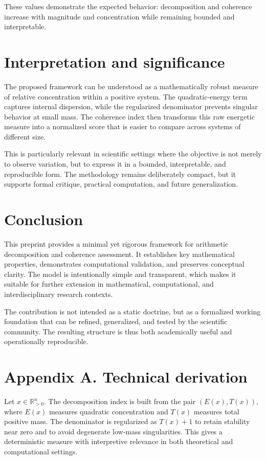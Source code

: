 \documentclass[11pt]{article}
\begin{document}
These values demonstrate the expected behavior: decomposition and coherence increase with magnitude and concentration while remaining bounded and interpretable.

\section{Interpretation and significance}
The proposed framework can be understood as a mathematically robust measure of relative concentration within a positive system. The quadratic-energy term captures internal dispersion, while the regularized denominator prevents singular behavior at small mass. The coherence index then transforms this raw energetic measure into a normalized score that is easier to compare across systems of different size.

This is particularly relevant in scientific settings where the objective is not merely to observe variation, but to express it in a bounded, interpretable, and reproducible form. The methodology remains deliberately compact, but it supports formal critique, practical computation, and future generalization.

\section{Conclusion}
This preprint provides a minimal yet rigorous framework for arithmetic decomposition and coherence assessment. It establishes key mathematical properties, demonstrates computational validation, and preserves conceptual clarity. The model is intentionally simple and transparent, which makes it suitable for further extension in mathematical, computational, and interdisciplinary research contexts.

The contribution is not intended as a static doctrine, but as a formalized working foundation that can be refined, generalized, and tested by the scientific community. The resulting structure is thus both academically useful and operationally reproducible.

\appendix
\section{Appendix A. Technical derivation}
Let $x\in\mathbb{R}_{>0}^n$. The decomposition index is built from the pair $(E(x), T(x))$, where $E(x)$ measures quadratic concentration and $T(x)$ measures total positive mass. The denominator is regularized as $T(x)+1$ to retain stability near zero and to avoid degenerate low-mass singularities. This gives a deterministic measure with interpretive relevance in both theoretical and computational settings.
\end{document}
